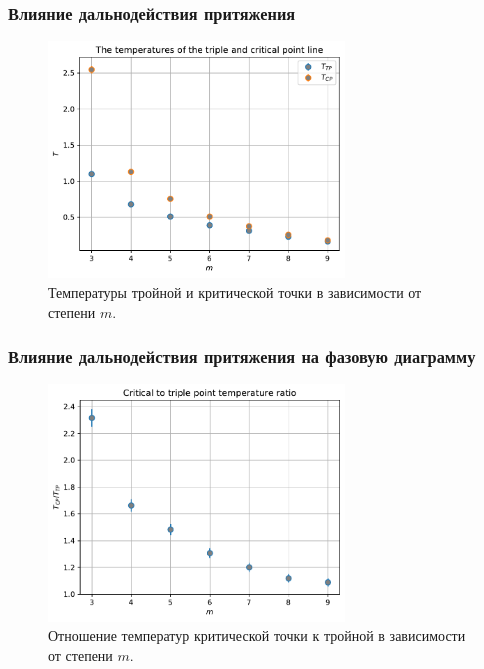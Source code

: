 \documentclass[pdf,hyperref={unicode}]{beamer}
\begin{document}
\begin{frame}
\transdissolve[duration=0.2]
\frametitle{Влияние дальнодействия притяжения}

\begin{figure}[h]
\begin{center}
\includegraphics[width=0.7\textwidth]{temperatures_triple_critical_Widom}
\caption{ \tiny Температуры тройной и критической точки в зависимости от степени $m$.}
\label{risTcpTtp}
\end{center}
\end{figure}

\end{frame}





\begin{frame}
\transdissolve[duration=0.2]
\frametitle{Влияние дальнодействия притяжения на фазовую диаграмму}

\begin{figure}[h]
\begin{center}
\includegraphics[width=0.7\textwidth]{effect_of_long-range_attraction}
\caption{\tiny Отношение температур критической точки к тройной в зависимости от степени $m$.}
\label{risTcpTtpWidoml}
\end{center}
\end{figure}

\end{frame}
\end{document}
